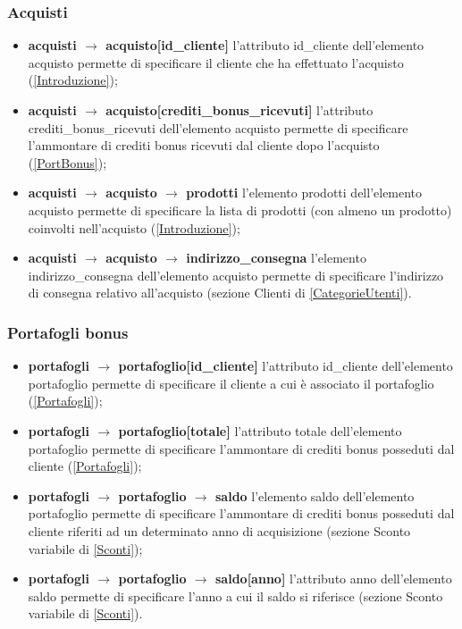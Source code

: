 \documentclass[a4paper, 14pt]{article}
\begin{document}
\begin{flushleft}
			\subsubsection{Acquisti}
			\begin{itemize}
				\item \textbf{acquisti $\rightarrow$ acquisto[id\_cliente] } l'attributo id\_cliente dell'elemento acquisto permette di specificare il cliente che ha effettuato l'acquisto (\ref{Introduzione});
				\item \textbf{acquisti $\rightarrow$ acquisto[crediti\_bonus\_ricevuti] } l'attributo crediti\_bonus\_ricevuti dell'elemento acquisto permette di specificare l'ammontare di crediti bonus ricevuti dal cliente dopo l'acquisto (\ref{PortBonus});
				\item \textbf{acquisti $\rightarrow$ acquisto $\rightarrow$ prodotti } l'elemento prodotti dell'elemento acquisto permette di specificare la lista di prodotti (con almeno un prodotto) coinvolti nell'acquisto (\ref{Introduzione});
				\item \textbf{acquisti $\rightarrow$ acquisto $\rightarrow$ indirizzo\_consegna } l'elemento indirizzo\_consegna dell'elemento acquisto permette di specificare l'indirizzo di consegna relativo all'acquisto (sezione Clienti di \ref{CategorieUtenti}).
			\end{itemize}
			\smallskip
			\subsubsection{Portafogli bonus} 
			\begin{itemize}
				\item \textbf{portafogli $\rightarrow$ portafoglio[id\_cliente] } l'attributo id\_cliente dell'elemento portafoglio permette di specificare il cliente a cui è associato il portafoglio (\ref{Portafogli});
				\item \textbf{portafogli $\rightarrow$ portafoglio[totale] } l'attributo totale dell'elemento portafoglio permette di specificare l'ammontare di crediti bonus posseduti dal cliente (\ref{Portafogli});
				\item \textbf{portafogli $\rightarrow$ portafoglio $\rightarrow$ saldo } l'elemento saldo dell'elemento portafoglio permette di specificare l'ammontare di crediti bonus posseduti dal cliente riferiti ad un determinato anno di acquisizione (sezione Sconto variabile di \ref{Sconti});
				\item \textbf{portafogli $\rightarrow$ portafoglio $\rightarrow$ saldo[anno] } l'attributo anno dell'elemento saldo permette di specificare l'anno
				a cui il saldo si riferisce (sezione Sconto variabile di \ref{Sconti}).
			\end{itemize}
			\smallskip


\end{flushleft}
\end{document}
